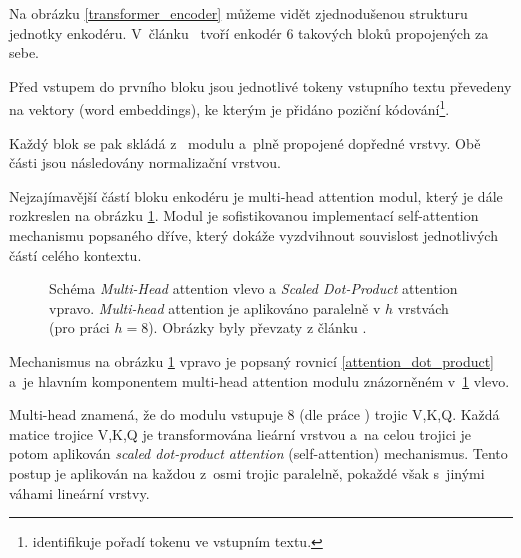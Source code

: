 Na obrázku \ref{transformer_encoder} můžeme vidět zjednodušenou strukturu jednotky enkodéru. V~článku~\cite{Transformers} tvoří enkodér 6 takových bloků propojených za sebe.\par
Před vstupem do prvního bloku jsou jednotlivé tokeny vstupního textu převedeny na vektory (word embeddings), ke kterým je přidáno poziční kódování\footnote{identifikuje pořadí tokenu ve vstupním textu.}.\par
Každý blok se pak skládá z~ modulu a~plně propojené dopředné vrstvy. Obě části jsou následovány normalizační vrstvou.\par
Nejzajímavější částí bloku enkodéru je multi-head attention modul, který je dále rozkreslen na obrázku \ref{multihead}. Modul je sofistikovanou implementací self-attention mechanismu popsaného dříve, který dokáže vyzdvihnout souvislost jednotlivých částí celého kontextu. 

\begin{figure}[hbt]
    \centering
	\caption{Schéma \emph{Multi-Head} attention vlevo a \emph{Scaled Dot-Product} attention vpravo. \emph{Multi-head} attention je aplikováno paralelně v $h$ vrstvách (pro práci \cite{Transformers} $h=8$). Obrázky byly převzaty z článku \cite{Transformers}.}
	\label{multihead}
\end{figure}

Mechanismus na obrázku \ref{multihead} vpravo je popsaný rovnicí \ref{attention_dot_product} a~je hlavním komponentem multi-head attention modulu znázorněném v~\ref{multihead} vlevo.\par
Multi-head znamená, že do modulu vstupuje 8 (dle práce \cite{Transformers}) trojic V,K,Q. Každá matice trojice V,K,Q je transformována lieární vrstvou a~na celou trojici je potom aplikován \emph{scaled dot-product attention} (self-attention) mechanismus. Tento postup je aplikován na každou z~osmi trojic paralelně, pokaždé však s~jinými váhami lineární vrstvy.

